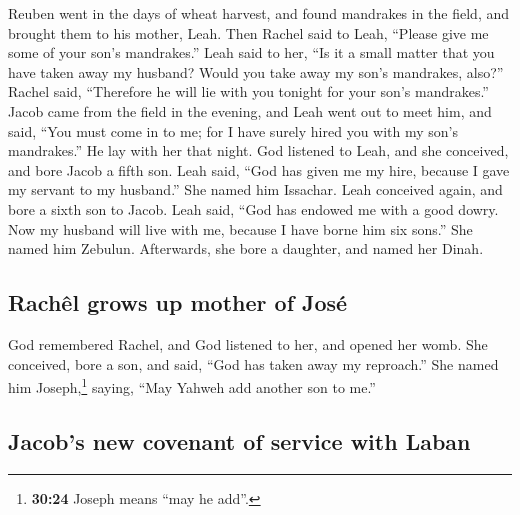  Reuben went in the days of wheat harvest, and found
mandrakes in the field, and brought them to his mother, Leah. Then
Rachel said to Leah, ``Please give me some of your son's mandrakes.''
 Leah said to her, ``Is it a small matter that you have
taken away my husband? Would you take away my son's mandrakes, also?''
Rachel said, ``Therefore he will lie with you tonight for your son's
mandrakes.''  Jacob came from the field in the evening,
and Leah went out to meet him, and said, ``You must come in to me; for I
have surely hired you with my son's mandrakes.'' He lay with her that
night.  God listened to Leah, and she conceived, and bore
Jacob a fifth son.  Leah said, ``God has given me my
hire, because I gave my servant to my husband.'' She named him Issachar.
 Leah conceived again, and bore a sixth son to Jacob.
 Leah said, ``God has endowed me with a good dowry. Now
my husband will live with me, because I have borne him six sons.'' She
named him Zebulun.  Afterwards, she bore a daughter, and
named her Dinah.

\hypertarget{rachuxeal-grows-up-mother-of-josuxe9}{%
\subsection{Rachêl grows up mother of
José}\label{rachuxeal-grows-up-mother-of-josuxe9}}

 God remembered Rachel, and God listened to her, and
opened her womb.  She conceived, bore a son, and said,
``God has taken away my reproach.''  She named him
Joseph,\footnote{\textbf{30:24} Joseph means ``may he add''.} saying,
``May Yahweh add another son to me.''

\hypertarget{jacobs-new-covenant-of-service-with-laban}{%
\subsection{Jacob's new covenant of service with
Laban}\label{jacobs-new-covenant-of-service-with-laban}}

